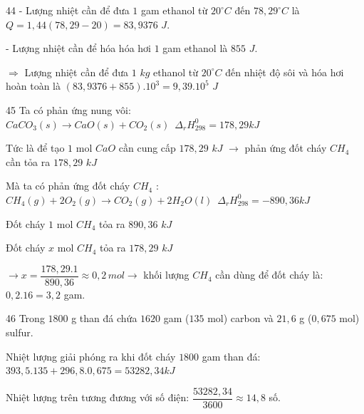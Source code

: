 \def\writeANS{}
\begin{loigiaibth}{44}
  - Lượng nhiệt cần để đưa $1$ gam ethanol từ $20^\circ C$ đến $78{,}29^\circ C$ là $Q = 1{,}44(78{,}29 - 20) = 83{,}9376$ $J$. \par - Lượng nhiệt cần để hóa hóa hơi $1$ gam ethanol là $855$ $J$. \par $\Rightarrow $ Lượng nhiệt cần để đưa $1$ $kg$ ethanol từ $20^\circ C$ đến nhiệt độ sôi và hóa hơi hoàn toàn là $(83{,}9376+855).10^3 = 9{,}39.10^5$ $J$
\end{loigiaibth}
\def\writeANS{}
\begin{loigiaibth}{45}
  Ta có phản ứng nung vôi: $CaCO_3(s) \rightarrow CaO(s) + CO_2(s) \,\,\, \Delta _r H_{298}^0 = 178{,}29kJ$ \par Tức là để tạo $1$ mol $CaO$ cần cung cấp $178{,}29$ $kJ$ $\rightarrow $ phản ứng đốt cháy $CH_4$ cần tỏa ra $178{,}29$ $kJ$ \par Mà ta có phản ứng đốt cháy $CH_4$ : $CH_4(g) + 2O_2(g) \rightarrow CO_2(g) + 2H_2O(l) \,\,\, \Delta _r H_{298}^0 = -890{,}36kJ$ \par Đốt cháy $1$ mol $CH_4$ tỏa ra $890{,}36$ $kJ$ \par Đốt cháy $x$ mol $CH_4$ tỏa ra $178{,}29$ $kJ$ \par $\rightarrow x = \dfrac {178{,}29.1}{890{,}36} \approx 0{,}2 \, mol \rightarrow $ khối lượng $CH_4$ cần dùng để đốt cháy là: $0{,}2.16 = 3{,}2$ gam.
\end{loigiaibth}
\def\writeANS{}
\begin{loigiaibth}{46}
  Trong $1800$ g than đá chứa $1620$ gam ($135$ mol) carbon và $21{,}6$ g ($0{,}675$ mol) sulfur. \par Nhiệt lượng giải phóng ra khi đốt cháy $1800$ gam than đá: $393{,}5.135 + 296{,}8.0{,}675 = 53282{,}34kJ$ \par Nhiệt lượng trên tương đương với số điện: $\dfrac {53282{,}34}{3600} \approx 14{,}8$ số.
\end{loigiaibth}
